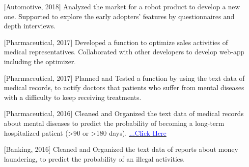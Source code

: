 \begin{cventries}
{\begin{cvenumerate}
        \item {[Automotive, 2018] Analyzed the market for a robot product to develop a new one. Supported to explore the early adopters' features by questionnaires and depth interviews.}
        \item {[Pharmaceutical, 2017] Developed a function to optimize sales activities of medical representatives. Collaborated with other developers to develop web-app including the optimizer.}
        \item {[Pharmaceutical, 2017] Planned and Tested a function by using the text data of medical records, to notify doctors that patients who suffer from mental diseases with a difficulty to keep receiving treatments.}
        \item {[Pharmaceutical, 2016] Cleaned and Organized the text data of medical records about mental diseases to predict the probability of becoming a long-term hospitalized patient (>90 or >180 days). \href{https://www.ibm.com/downloads/cas/VVYMQYLZ}{\textcolor{blue}{...Click Here}}}
        \item {[Banking, 2016] Cleaned and Organized the text data of reports about money laundering, to predict the probability of an illegal activities.}
      \end{cvenumerate}
    }
\end{cventries}
